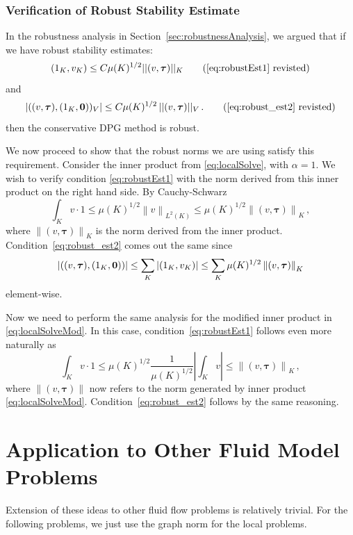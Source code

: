 \documentclass[letterpaper]{article}
\def\btau{\boldsymbol\tau}
\def\bftau{\boldsymbol\tau}
\newcommand{\norm}[1]{\left\| #1 \right\|}
\newcommand{\LRl}[1]{\left| #1 \right|}
\begin{document}
\subsubsection{Verification of Robust Stability Estimate}
In the robustness analysis in Section~\ref{sec:robustnessAnalysis}, we argued
that if we have robust stability estimates:
\begin{equation}
(1_K, v_K) \leq C \mu(K)^{1/2} || (v,\bftau) ||_K
\tag{\ref{eq:robustEst1} revisted}
\end{equation}
and
\begin{equation}
| ((v,\bftau),(1_K,{\bf 0}))_V | \leq C \mu(K)^{1/2} \, || (v,\bftau) ||_V\,.
\tag{\ref{eq:robust_est2} revisted}
\end{equation}
then the conservative DPG method is robust.

We now proceed to show that the robust norms we are using satisfy this
requirement.
Consider the inner product from \eqref{eq:localSolve}, with
$\alpha=1$. We wish to
verify condition \eqref{eq:robustEst1} with the norm derived from this inner
product on the right hand side. By Cauchy-Schwarz
\begin{equation}
   \int_K v\cdot
   1\leq\mu(K)^{1/2}\norm{v}_{L^2(K)}\leq\mu(K)^{1/2}\norm{(v,\btau)}_K\,,
   \label{eq:robustProof}
\end{equation}
where $\norm{(v,\btau)}_K$ is the norm derived from the inner product.
Condition~\eqref{eq:robust_est2} comes out the same since
$$|(
(v,\btau),(1_K,{\bf0}))| \leq
\sum_K|(1_K,v_K)|\leq\sum_K\mu(K)^{1/2}\norm{(v,\btau)}_K
$$
element-wise.

Now we need to perform the same analysis for the modified inner product in
\eqref{eq:localSolveMod}. In this case,
condition~\eqref{eq:robustEst1} follows even more naturally as
\begin{equation}
   \int_K v\cdot1\leq\mu(K)^{1/2}\frac{1}{\mu(K)^{1/2}}\LRl{\int_Kv}
   \leq\norm{(v,\btau)}_K\,,
   \label{eq:robustProof2}
\end{equation}
where $\norm{(v,\btau)}$ now refers to the norm generated by inner product
\eqref{eq:localSolveMod}. Condition~\eqref{eq:robust_est2} follows by the same
reasoning.

\section{Application to Other Fluid Model Problems}
Extension of these ideas to other fluid flow problems is relatively trivial.
For the following problems, we just use the graph norm for the local problems.
\end{document}
